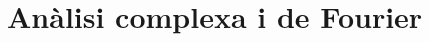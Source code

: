 \documentclass[../../main.tex]{subfiles}
\begin{document}
\part{Anàlisi complexa i de Fourier}

\end{document}

